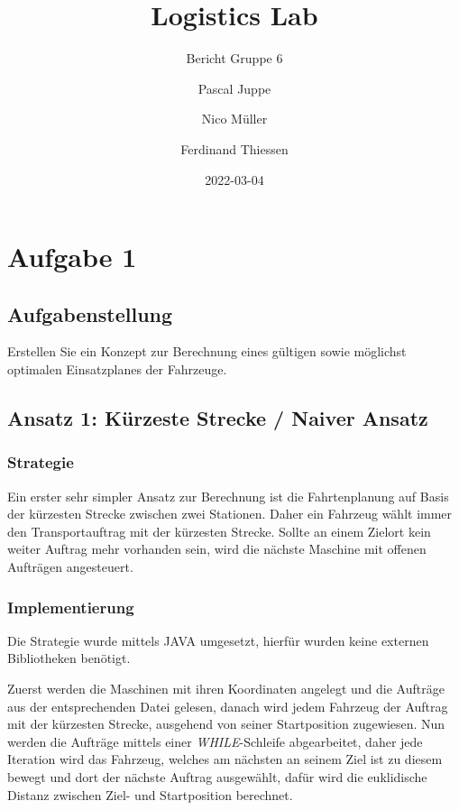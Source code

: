 \documentclass[ngerman]{tudscrreprt}
\begin{document}
\date{2022-03-04}
\author{%
Pascal Juppe%
%
\and%
Nico Müller%
%
\and%
Ferdinand Thiessen%
%
}
\title{Logistics Lab}
\subtitle{Bericht Gruppe 6}
\maketitle


\setcounter{tocdepth}{1}
\tableofcontents

\chapter{Aufgabe 1}
\section{Aufgabenstellung}
Erstellen Sie ein Konzept zur Berechnung eines gültigen sowie möglichst optimalen Einsatzplanes der Fahrzeuge.

\section{Ansatz 1: Kürzeste Strecke / Naiver Ansatz}
\subsection{Strategie}
Ein erster sehr simpler Ansatz zur Berechnung ist die Fahrtenplanung auf Basis
der kürzesten Strecke zwischen zwei Stationen.
Daher ein Fahrzeug wählt immer den Transportauftrag mit der kürzesten Strecke.
Sollte an einem Zielort kein weiter Auftrag mehr vorhanden sein, wird die nächste
Maschine mit offenen Aufträgen angesteuert.

\subsection{Implementierung}
Die Strategie wurde mittels JAVA umgesetzt, hierfür wurden keine externen
Bibliotheken benötigt.

Zuerst werden die Maschinen mit ihren Koordinaten angelegt und die Aufträge aus
der entsprechenden Datei gelesen, danach wird jedem Fahrzeug der Auftrag mit der kürzesten Strecke, ausgehend von seiner Startposition zugewiesen.
Nun werden die Aufträge mittels einer \emph{WHILE}-Schleife abgearbeitet,
daher jede Iteration wird das Fahrzeug, welches am nächsten an seinem Ziel ist zu diesem
bewegt und dort der nächste Auftrag ausgewählt, dafür wird die euklidische Distanz zwischen
Ziel- und Startposition berechnet.
\end{document}
